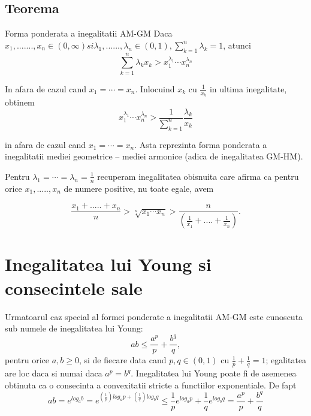 \documentclass[a4paper,12pt,oneside]{report}
\begin{document}
\subsection{Teorema}
Forma ponderata a inegalitatii AM-GM
Daca \(x_{1},.......,x_{n}\in \left ( 0,\infty  \right ) si \lambda_{1},......,\lambda _{n} \in \left ( 0 , 1 \right ), \sum_{k = 1}^{n}\lambda _{k}= 1\), atunci
\begin{displaymath}
  \sum_{k = 1}^{n}\lambda _{k}x_{k}> x_{1}^{\lambda _{1}}\cdots x_{n}^{\lambda _{n}}
\end{displaymath}

In afara de cazul cand \(x_{1} = \cdots = x_{n}\). 
	Inlocuind \(x_{k}\) cu \(\frac{1}{x_{k} }\) in ultima inegalitate, obtinem 
\begin{displaymath}
  x_{1}^{\lambda _{1}}\cdots x_{n}^{\lambda _{n}}> \frac{1}{\sum_{k = 1}^{n}}\frac{\lambda _{k}}{x_{k}}
\end{displaymath}

in afara de cazul cand \(x_{1} = \cdots = x_{n}\). 
Asta reprezinta forma ponderata a inegalitatii mediei geometrice – mediei armonice (adica de inegalitatea GM-HM). 

Pentru \(\lambda _{1} = \cdots =\lambda _{n}= \frac{1}{n}\) recuperam inegalitatea obisnuita care afirma ca pentru orice \(x_{1},.....,x_{n}\) de numere positive, nu toate egale, avem

\begin{displaymath}
  \frac{x_{1}+.....+x_{n}}{n}> \sqrt[n]{x_{1}\cdots x_{n}}> \frac{n}{\left ( \frac{1}{x_{1}}+....+\frac{1}{x_{n}} \right )}. 
\end{displaymath}




\section{Inegalitatea lui Young si consecintele sale}

Urmatoarul caz special al formei ponderate a inegalitatii AM-GM este cunoscuta sub numele de inegalitatea lui Young:  
\begin{displaymath}
  ab \leq \frac{a^{p}}{p}+ \frac{b^{q}}{q},
\end{displaymath}
pentru orice \(a,b \geq 0\),
si de fiecare data cand  \(p,q \in \left ( 0 , 1 \right )\) cu \(\frac{1}{p}+\frac{1}{q} = 1\); egalitatea are loc daca si numai daca \(a^{p}= b^{q}\). Inegalitatea lui Young poate fi de asemenea obtinuta ca o consecinta a convexitatii stricte a functiilor exponentiale. De fapt 
\begin{displaymath}
  ab = e^{log_{a}b}= e^{\left (\frac{1}{p}  \right )log_{a}p+ \left ( \frac{1}{q} \right )log_{b}q}
\leq \frac{1}{p}e^{log_{a}p}+\frac{1}{q}e^{log_{b}q}= \frac{a^{p}}{p}+\frac{b^{q}}{q}
\end{displaymath}
\end{document}
